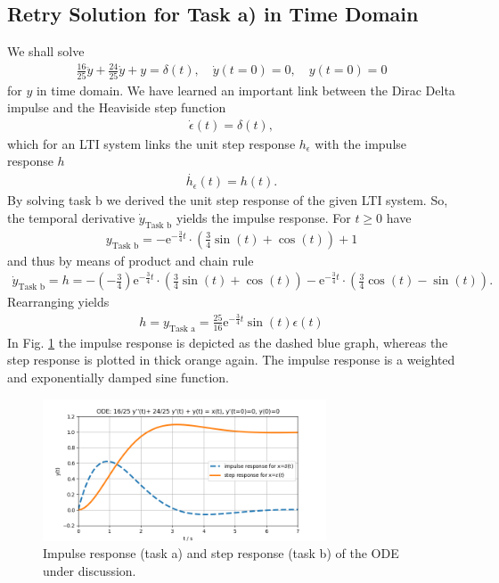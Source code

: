 \documentclass[a4paper,11pt,oneside]{scrartcl}
\begin{document}
\subsection{Retry Solution for Task a) in Time Domain}
We shall solve
\begin{align}
\frac{16}{25} \ddot{y} + \frac{24}{25} \dot{y} + y = \delta(t),
\quad \dot{y}(t=0) = 0,\quad y(t=0)=0
\end{align}
for $y$ in time domain.
%
We have learned an important link between the Dirac Delta impulse and the
Heaviside step function
\begin{align}
\dot{\epsilon}(t) = \delta(t),
\end{align}
which for an LTI system links the unit step response $h_\epsilon$ with the
impulse response $h$
\begin{align}
\dot{h_\epsilon}(t) = h(t).
\end{align}
%
By solving task b we derived the unit step response of the given LTI system.
So, the temporal derivative $\dot{y}_\text{Task b}$ yields the impulse response.
For $t\geq 0$ have
\begin{align}
y_\text{Task b} =
- \mathrm{e}^{-\frac{3}{4} t} \cdot
\left( \frac{3}{4} \sin(t) + \cos(t)\right) + 1
\end{align}
and thus by means of product and chain rule
\begin{align}
\dot{y}_\text{Task b} = h =
- (-\frac{3}{4})\mathrm{e}^{-\frac{3}{4} t} \cdot
\left( \frac{3}{4} \sin(t) + \cos(t)\right)
- \mathrm{e}^{-\frac{3}{4} t} \cdot
\left( \frac{3}{4} \cos(t) - \sin(t)\right).
\end{align}
Rearranging yields
\begin{align}
\boxed{
h = y_\text{Task a} = \frac{25}{16} \mathrm{e}^{-\frac{3}{4} t} \sin(t) \epsilon(t)
}
\end{align}
%
In Fig. \ref{fig:impulse_step_response} the impulse response is depicted as
the dashed blue graph, whereas the step response is plotted in thick
orange again.
The impulse response is a weighted and exponentially damped sine function.

\begin{figure}[h!]
\centering
\includegraphics[width=0.75\textwidth]{impulse_step_response}
\caption{Impulse response (task a) and step response (task b) of the ODE under discussion.}
\label{fig:impulse_step_response}
\end{figure}
\end{document}
